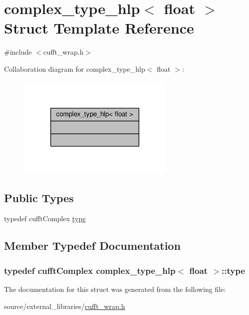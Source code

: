 \hypertarget{structcomplex__type__hlp_3_01float_01_4}{\section{complex\-\_\-type\-\_\-hlp$<$ float $>$ Struct Template Reference}
\label{structcomplex__type__hlp_3_01float_01_4}
}


{\ttfamily \#include $<$cufft\-\_\-wrap.\-h$>$}



Collaboration diagram for complex\-\_\-type\-\_\-hlp$<$ float $>$\-:\nopagebreak
\begin{figure}[H]
\begin{center}
\leavevmode
\includegraphics[width=212pt]{structcomplex__type__hlp_3_01float_01_4__coll__graph}
\end{center}
\end{figure}
\subsection*{Public Types}
\begin{DoxyCompactItemize}
\item 
typedef cufft\-Complex \hyperlink{structcomplex__type__hlp_3_01float_01_4_ae0cfcbdeb31ff876914355874c131ceb}{type}
\end{DoxyCompactItemize}


\subsection{Member Typedef Documentation}
\hypertarget{structcomplex__type__hlp_3_01float_01_4_ae0cfcbdeb31ff876914355874c131ceb}{
\subsubsection[{type}]{\setlength{\rightskip}{0pt plus 5cm}typedef cufft\-Complex {\bf complex\-\_\-type\-\_\-hlp}$<$ float $>$\-::{\bf type}}}\label{structcomplex__type__hlp_3_01float_01_4_ae0cfcbdeb31ff876914355874c131ceb}


The documentation for this struct was generated from the following file\-:\begin{DoxyCompactItemize}
\item 
source/external\-\_\-libraries/\hyperlink{cufft__wrap_8h}{cufft\-\_\-wrap.\-h}\end{DoxyCompactItemize}
